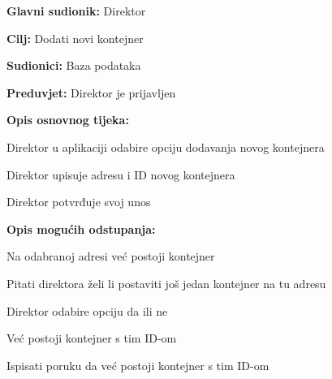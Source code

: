 			\noindent {}
			\begin{packed_item}
				
				\item \textbf{Glavni sudionik: } Direktor
				\item  \textbf{Cilj:} Dodati novi kontejner
				\item  \textbf{Sudionici:} Baza podataka
				\item  \textbf{Preduvjet:} Direktor je prijavljen
				\item  \textbf{Opis osnovnog tijeka:}
				
				\item[] \begin{packed_enum}
					
					\item Direktor u aplikaciji odabire opciju dodavanja novog kontejnera
					\item Direktor upisuje adresu i ID novog kontejnera 
					\item Direktor potvrđuje svoj unos
				\end{packed_enum}
				
				\item  \textbf{Opis mogućih odstupanja:}
				
				\item[] \begin{packed_item}
					
					\item[2.a] Na odabranoj adresi već postoji kontejner
					\item[] \begin{packed_enum}
						
						\item Pitati direktora želi li postaviti još jedan kontejner na tu adresu
						\item Direktor odabire opciju da ili ne
						
					\end{packed_enum}
					\item[2.b] Već postoji kontejner s tim ID-om
					\item[] \begin{packed_enum}
						
						\item Ispisati poruku da već postoji kontejner s tim ID-om
						
					\end{packed_enum}
					
				\end{packed_item}
			\end{packed_item}
			

